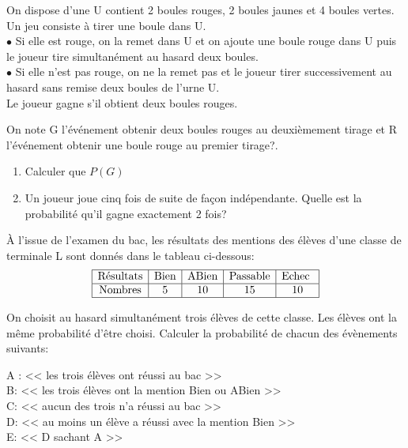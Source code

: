 \begin{exercice}
On dispose d'une U  contient 2 boules rouges, 2 boules jaunes  et 4 boules vertes.\\ Un jeu consiste  à tirer une boule dans U. \\
$ \bullet $ Si elle est rouge, on la remet dans U et on ajoute une boule rouge dans U puis  le  joueur  tire  simultanément au hasard deux boules.\\
$ \bullet $  Si elle n'est pas rouge, on ne la remet pas et  le joueur tirer successivement  au  hasard  sans remise  deux  boules de l'urne U.\\  Le joueur gagne s'il obtient deux boules rouges.

On note G l'événement  obtenir deux boules rouges au deuxièmement tirage  et R l'événement obtenir une boule rouge au premier tirage?.
\begin{enumerate}
\item Calculer que $ P(G) $
\item Un joueur  joue cinq fois de suite de  façon indépendante. Quelle est la probabilité qu'il gagne exactement 2 fois?

\end{enumerate}

\end{exercice}
\begin{exercice}
 À l'issue de l'examen du bac, les résultats des mentions des élèves d'une classe de terminale L sont donnés dans le tableau ci-dessous:
 $$
  \begin{array}{|c|c|c|c|c|}
  \hline
   \text{Résultats} & \text{Bien}& \text{ABien} & \text{Passable} &\text{Echec } \\
  \hline
  \text{Nombres}  & 5 & 10 & 15&10 \\
  \hline
 \end{array} 
 $$
 
 On choisit au hasard simultanément trois élèves de cette classe. Les élèves ont la même probabilité d'être choisi.  Calculer la probabilité de chacun des  évènements suivants:\medskip
 
  A :  << les trois élèves ont réussi au bac >>\\
  B: << les trois élèves ont la mention Bien ou ABien >>\\
  C: << aucun des trois n'a réussi au bac >> \\
   D: << au moins un élève a réussi avec la mention Bien  >>\\
    E: << D sachant A >>
\end{exercice}



